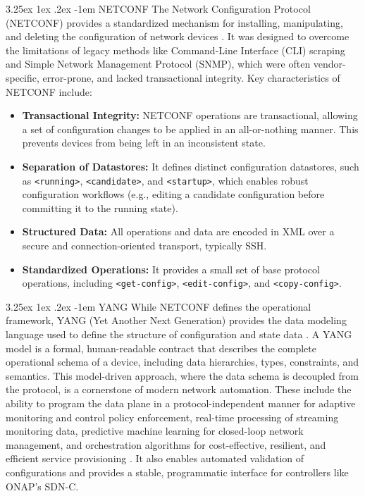 \documentclass[12pt, a4paper, reqno, oneside]{book}
\makeatletter
\renewcommand\paragraph{\@startsection{paragraph}{5}{\z@}%
  {3.25ex \@plus1ex \@minus.2ex}%
  {-1em}%
  {\normalfont\normalsize\bfseries}}
\makeatother
\begin{document}
\paragraph{NETCONF}
The Network Configuration Protocol (NETCONF) provides a standardized mechanism for installing, manipulating, and deleting the configuration of network devices \cite{rfc6241_netconf}. It was designed to overcome the limitations of legacy methods like Command-Line Interface (CLI) scraping and Simple Network Management Protocol (SNMP), which were often vendor-specific, error-prone, and lacked transactional integrity. Key characteristics of NETCONF include:
\begin{itemize}
    \item \textbf{Transactional Integrity:} NETCONF operations are transactional, allowing a set of configuration changes to be applied in an all-or-nothing manner. This prevents devices from being left in an inconsistent state.
    \item \textbf{Separation of Datastores:} It defines distinct configuration datastores, such as \texttt{<running>}, \texttt{<candidate>}, and \texttt{<startup>}, which enables robust configuration workflows (e.g., editing a candidate configuration before committing it to the running state).
    \item \textbf{Structured Data:} All operations and data are encoded in XML over a secure and connection-oriented transport, typically SSH.
    \item \textbf{Standardized Operations:} It provides a small set of base protocol operations, including \texttt{<get-config>}, \texttt{<edit-config>}, and \texttt{<copy-config>}.
\end{itemize}

\paragraph{YANG}
While NETCONF defines the operational framework, YANG (Yet Another Next Generation) provides the data modeling language used to define the structure of configuration and state data \cite{rfc7950_yang}. A YANG model is a formal, human-readable contract that describes the complete operational schema of a device, including data hierarchies, types, constraints, and semantics. This model-driven approach, where the data schema is decoupled from the protocol, is a cornerstone of modern network automation. These include the ability to program the data plane in a protocol-independent manner for adaptive monitoring and control policy enforcement, real-time processing of streaming monitoring data, predictive machine learning for closed-loop network management, and orchestration algorithms for cost-effective, resilient, and efficient service provisioning \cite{clemm2020network}. It also enables automated validation of configurations and provides a stable, programmatic interface for controllers like ONAP's SDN-C.
\end{document}
